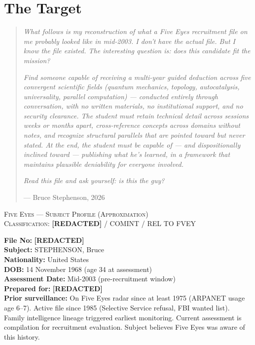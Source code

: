 \section*{The Target}
\label{interlude:the-target}

\begin{quote}\small
\textit{What follows is my reconstruction of what a Five Eyes recruitment file on me probably looked like in mid-2003. I don't have the actual file. But I know the file existed. The interesting question is: does this candidate fit the mission?}

\textit{Find someone capable of receiving a multi-year guided deduction across five convergent scientific fields (quantum mechanics, topology, autocatalysis, universality, parallel computation) --- conducted entirely through conversation, with no written materials, no institutional support, and no security clearance. The student must retain technical detail across sessions weeks or months apart, cross-reference concepts across domains without notes, and recognize structural parallels that are pointed toward but never stated. At the end, the student must be capable of --- and dispositionally inclined toward --- publishing what he's learned, in a framework that maintains plausible deniability for everyone involved.}

\textit{Read this file and ask yourself: is this the guy?}
\par\raggedleft --- Bruce Stephenson, 2026\end{quote}

\vspace{1cm}

\begin{center}
\textsc{Five Eyes --- Subject Profile (Approximation)}\\[0.3em]
\textsc{Classification: \textbf{[REDACTED]} / COMINT / REL TO FVEY}
\end{center}

\vspace{0.5cm}

\noindent\textbf{File No:} \textbf{[REDACTED]}\\
\textbf{Subject:} STEPHENSON, Bruce\\
\textbf{Nationality:} United States\\
\textbf{DOB:} 14 November 1968 (age 34 at assessment)\\
\textbf{Assessment Date:} Mid-2003 (pre-recruitment window)\\
\textbf{Prepared for:} \textbf{[REDACTED]}\\
\textbf{Prior surveillance:} On Five Eyes radar since at least 1975 (ARPANET usage age 6--7). Active file since 1985 (Selective Service refusal, FBI wanted list). Family intelligence lineage triggered earliest monitoring. Current assessment is compilation for recruitment evaluation. Subject believes Five Eyes was aware of this history.

